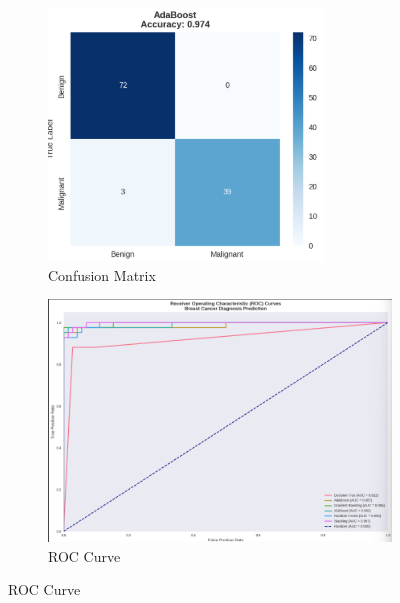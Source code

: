 \documentclass[11pt]{article}
\begin{document}
\begin{figure}[H]
\centering
\begin{subfigure}{0.45\textwidth}
  \centering
  \includegraphics[width=\linewidth]{f4.png}
  \caption{Confusion Matrix}
\end{subfigure}
\hfill
\begin{subfigure}{0.45\textwidth}
  \centering
  \includegraphics[width=\linewidth]{x1.png}
  \caption{ROC Curve}
\end{subfigure}

\end{figure}
\end{document}
